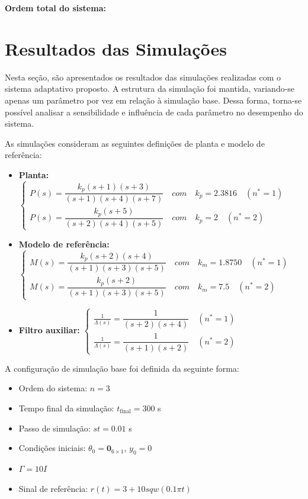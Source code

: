 \documentclass[10pt]{article}
\begin{document}
\vspace{1em}
\noindent
\textbf{Ordem total do sistema:} 

\section{Resultados das Simulações}

Nesta seção, são apresentados os resultados das simulações realizadas com o sistema adaptativo proposto. A estrutura da simulação foi mantida, variando-se apenas um parâmetro por vez em relação à simulação base. Dessa forma, torna-se possível analisar a sensibilidade e influência de cada parâmetro no desempenho do sistema.

As simulações consideram as seguintes definições de planta e modelo de referência:

\begin{itemize}
    \item \textbf{Planta:} $\begin{cases}
        P(s) = \dfrac{k_p(s+1)(s+3)}{(s+1)(s+4)(s+7)} \quad com \quad k_p = 2.3816 \quad (n^* = 1) \\ 
        P(s) = \dfrac{k_p(s+5)}{(s+2)(s+4)(s+5)} \quad com \quad k_p = 2 \quad (n^* = 2)
    \end{cases}$
    \item \textbf{Modelo de referência:} $\begin{cases}
        M(s) = \dfrac{k_p(s+2)(s+4)}{(s+1)(s+3)(s+5)} \quad com \quad k_m = 1.8750 \quad (n^* = 1) \\ 
        M(s) = \dfrac{k_p(s+2)}{(s+1)(s+3)(s+5)} \quad com \quad k_m = 7.5 \quad (n^* = 2)
    \end{cases}$
    \item \textbf{Filtro auxiliar:} $\begin{cases}
        \frac{1}{\Lambda(s)} = \dfrac{1}{(s + 2)(s + 4)} \quad (n^* = 1) \\
        \frac{1}{\Lambda(s)} = \dfrac{1}{(s + 1)(s + 2)} \quad (n^* = 2)
    \end{cases}$
    \end{itemize}

A configuração de simulação base foi definida da seguinte forma:

\begin{itemize}
    \item Ordem do sistema: $n = 3$
    \item Tempo final da simulação: $t_{\text{final}} = 300$ s
    \item Passo de simulação: $st = 0.01$ s
    \item Condições iniciais: $\theta_0 = \mathbf{0}_{6\times1}$, $y_0 = 0$
    \item $\Gamma = 10I$
    \item Sinal de referência: $r(t) =  3 + 10sqw(0.1 \pi t)$
\end{itemize}
\end{document}
